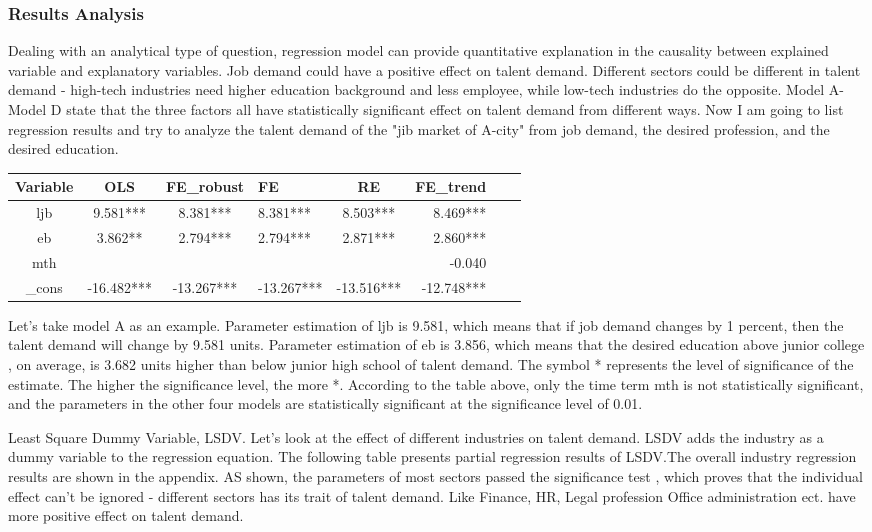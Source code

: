 \documentclass{mcmthesis}
\begin{document}
\subsubsection{Results Analysis}
Dealing with an analytical type of question, regression model can provide quantitative explanation in the causality between explained variable and explanatory variables. Job demand could have a positive effect on talent demand. Different sectors could be different in talent demand - high-tech industries need higher education background and less employee, while low-tech industries do the opposite. Model A-Model D state that the three factors all have statistically significant effect on talent demand from different ways. Now I am going to list regression results and try to analyze the talent demand of the "jib market of A-city" from job demand, the desired profession, and the desired education.

\begin{center}
	\begin{tabular}{c|cclcrcc}
		\hline
		Variable & OLS & FE\_robust & FE & RE & FE\_trend \\%
		\hline
		ljb & 9.581*** & 8.381*** & 8.381*** & 8.503*** & 8.469*** \\
		eb &  3.862** & 2.794*** & 2.794*** & 2.871*** & 2.860***  \\
		mth &      &     &     &      & -0.040  \\
		\_cons & -16.482*** & -13.267*** & -13.267*** & -13.516*** &   -12.748*** \\
		\hline
	\end{tabular}
\end{center}
\par \noindent
Let's take model A as an example. Parameter estimation of ljb is 9.581, which means that if job demand changes by 1 percent, then the talent demand will change by 9.581 units. Parameter estimation of eb is 3.856, which means that the desired education above junior college , on average, is 3.682 units higher than below junior high school of talent demand. The symbol * represents the level of significance of the estimate. The higher the significance level, the more *. According to the table above, only the time term mth is not statistically significant, and the parameters in the other four models are statistically significant at the significance level of 0.01.

\par \noindent
Least Square Dummy Variable, LSDV. Let's look at the effect of different industries on talent demand. LSDV adds the industry as a dummy variable to the regression equation. The following table presents partial regression results of LSDV.The overall industry regression results are shown in the appendix. AS shown, the parameters of most sectors passed the significance test , which proves that the individual effect can't be ignored - different sectors has its trait of talent demand. Like Finance, HR, Legal profession Office administration ect. have more positive effect on talent demand. 
\end{document}
